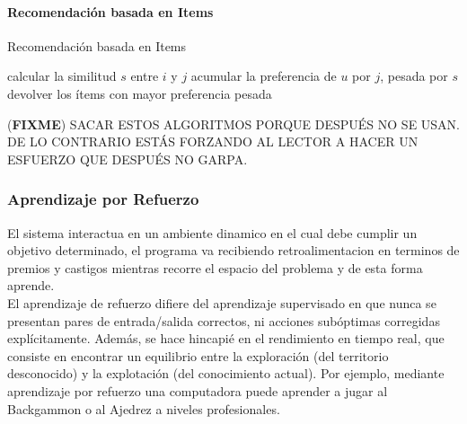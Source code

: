 \documentclass[a4paper,11pt,spanish]{book}
\newcommand*{\FIXME}[1]{{(\textbf{FIXME}) {#1}}}
\begin{document}
	\paragraph {Recomendación basada en Items}
	  \begin{algorithm}[h]
	    \caption{Recomendación basada en Items}
	    \label{reco_items}
	    \begin{algorithmic}
		    \State calcular la similitud $s$ entre $i$ y $j$
		    \State acumular la preferencia de $u$ por $j$, pesada por $s$
		    \State devolver los ítems con mayor preferencia pesada
		\EndFor
	      \EndFor
	    \end{algorithmic}
	  \end{algorithm}

          \FIXME{SACAR ESTOS ALGORITMOS PORQUE DESPUÉS NO SE USAN. DE LO
            CONTRARIO ESTÁS FORZANDO AL LECTOR A HACER UN ESFUERZO QUE DESPUÉS
            NO GARPA.}

      \subsubsection{Aprendizaje por Refuerzo}
	El sistema interactua en un ambiente dinamico en el cual debe cumplir un objetivo determinado, el programa va recibiendo retroalimentacion en terminos de premios y castigos mientras
	recorre el espacio del problema y de esta forma aprende.\\
	El aprendizaje de refuerzo difiere del aprendizaje supervisado en que nunca se presentan pares de entrada/salida correctos, ni acciones subóptimas corregidas explícitamente.
	Además, se hace hincapié en el rendimiento en tiempo real, que consiste en encontrar un equilibrio entre la exploración (del territorio desconocido) y la explotación
	(del conocimiento actual).
	Por ejemplo, mediante aprendizaje por refuerzo una computadora puede aprender a jugar al Backgammon o al Ajedrez a niveles profesionales.
\end{document}
